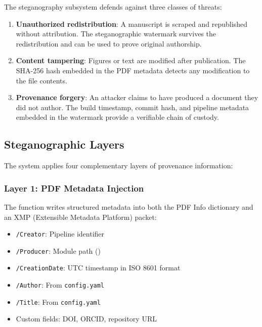 \documentclass[
]{article}
\providecommand{\tightlist}{%
  \setlength{\itemsep}{0pt}\setlength{\parskip}{0pt}}
\begin{document}
The steganography subsystem defends against three classes of threats:

\begin{enumerate}
\def\labelenumi{\arabic{enumi}.}
\tightlist
\item
  \textbf{Unauthorized redistribution}: A manuscript is scraped and
  republished without attribution. The steganographic watermark survives
  the redistribution and can be used to prove original authorship.
\item
  \textbf{Content tampering}: Figures or text are modified after
  publication. The SHA-256 hash embedded in the PDF metadata detects any
  modification to the file contents.
\item
  \textbf{Provenance forgery}: An attacker claims to have produced a
  document they did not author. The build timestamp, commit hash, and
  pipeline metadata embedded in the watermark provide a verifiable chain
  of custody.
\end{enumerate}

\subsection{Steganographic Layers}\label{steganographic-layers}

The system applies four complementary layers of provenance information:

\subsubsection{Layer 1: PDF Metadata
Injection}\label{layer-1-pdf-metadata-injection}

The  function writes structured metadata
into both the PDF Info dictionary and an XMP (Extensible Metadata
Platform) packet:

\begin{itemize}
\tightlist
\item
  \texttt{/Creator}: Pipeline identifier
\item
  \texttt{/Producer}: Module path
  ()
\item
  \texttt{/CreationDate}: UTC timestamp in ISO 8601 format
\item
  \texttt{/Author}: From \texttt{config.yaml}
\item
  \texttt{/Title}: From \texttt{config.yaml}
\item
  Custom fields: DOI, ORCID, repository URL
\end{itemize}
\end{document}
